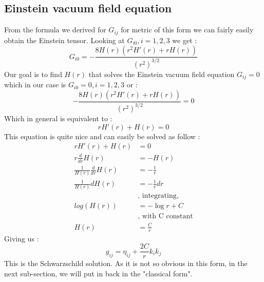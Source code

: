 \documentclass[a4paper,12pt]{article}
\theoremstyle{definition}
\begin{document}
\subsection{Einstein vacuum field equation}
From the formula we derived for $G_{ij}$ for metric of this form we can fairly easily obtain the Einstein tensor.
Looking at $G_{i0}, i=1,2,3$ we get :
\begin{equation}
	G_{i0}=-\frac{8 H(r) (r^2 H'(r)+rH(r))}{(r^2)^{3/2}}
\end{equation}
Our goal is to find $H(r)$ that solves the Einstein vacuum field equation $G_{ij}=0$ which in our case is $G_{i0}=0, i=1,2,3$ or :
\begin{equation}
	-\frac{8 H(r) (r^2 H'(r)+rH(r))}{(r^2)^{3/2}}=0
\end{equation}
Which in general is equivalent to :
\begin{equation}
	rH'(r)+H(r)=0
\end{equation}
This equation is quite nice and can easily be solved as follow :
\begin{align*}
	rH'(r)+H(r)&=0\\
	r\frac{d}{dr}H(r)&=-H(r)\\
	\frac{1}{H(r)}\frac{d}{dr}H(r)&=-\frac{1}{r}\\
	\frac{1}{H(r)}dH(r)&=-\frac{1}{r}dr \;\\
	&\text{, integrating,}\\
	log(H(r))&=-\log{r}+C \;\\
	&\text{, with C constant}\\
	H(r)&=\frac{C}{r}
\end{align*}
Giving us :
\begin{equation}
	g_{ij}=\eta_{ij}+\frac{2C}{r}k_ik_j
\end{equation}
This is the Schwarzschild solution. As it is not so obvious in this form, in the next sub-section, we will put in back in the "classical form".
\end{document}

